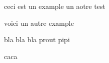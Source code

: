 \beguindocument
ceci est un example
un aotre test

voici un autre example

bla bla bla
prout
pipi


caca
